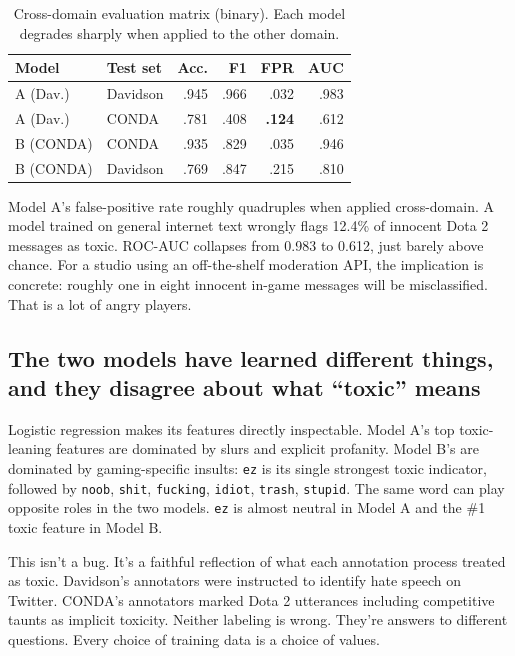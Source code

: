 \documentclass[11pt,twocolumn,letterpaper]{article}
\begin{document}
\begin{table}[t]
\centering
\small
\begin{tabular}{llrrrr}
\toprule
Model & Test set & Acc. & F1 & FPR & AUC \\
\midrule
A (Dav.) & Davidson  & .945 & .966 & .032 & .983 \\
A (Dav.) & CONDA     & .781 & .408 & \textbf{.124} & .612 \\
B (CONDA) & CONDA    & .935 & .829 & .035 & .946 \\
B (CONDA) & Davidson & .769 & .847 & .215 & .810 \\
\bottomrule
\end{tabular}
\caption{Cross-domain evaluation matrix (binary). Each model degrades sharply when applied to the other domain.}
\end{table}

Model A's false-positive rate roughly quadruples when applied cross-domain. A model trained on general internet text wrongly flags 12.4\% of innocent Dota 2 messages as toxic. ROC-AUC collapses from 0.983 to 0.612, just barely above chance. For a studio using an off-the-shelf moderation API, the implication is concrete: roughly one in eight innocent in-game messages will be misclassified. That is a lot of angry players.

\subsection{The two models have learned different things, and they disagree about what ``toxic'' means}

Logistic regression makes its features directly inspectable. Model A's top toxic-leaning features are dominated by slurs and explicit profanity. Model B's are dominated by gaming-specific insults: \texttt{ez} is its single strongest toxic indicator, followed by \texttt{noob}, \texttt{shit}, \texttt{fucking}, \texttt{idiot}, \texttt{trash}, \texttt{stupid}. The same word can play opposite roles in the two models. \texttt{ez} is almost neutral in Model A and the \#1 toxic feature in Model B.

This isn't a bug. It's a faithful reflection of what each annotation process treated as toxic. Davidson's annotators were instructed to identify hate speech on Twitter. CONDA's annotators marked Dota 2 utterances including competitive taunts as implicit toxicity. Neither labeling is wrong. They're answers to different questions. Every choice of training data is a choice of values.
\end{document}
